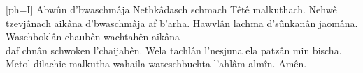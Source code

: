 %
\setcounter{songnum}{500}


[ph={I}]
  \chordsoff %
  \beginverse\justifycenter
    \vspace{3em}
    Abwûn d'bwaschmâja
    \vspace{1em}
    Nethkâdasch schmach
    \vspace{1em}
    Têtê malkuthach.
    \vspace{1em}
    Nehwê tzevjânach aikâna d'bwaschmâja af b'arha.
    \vspace{1em}
    Hawvlân lachma d'sûnkanân jaomâna.
    \vspace{1em}
    Waschboklân chaubên wachtahên aikâna\\
    daf chnân schwoken l'chaijabên.
    \vspace{1em}
    Wela tachlân l'nesjuna
    \vspace{1em}
    ela patzân min bischa.
    \vspace{1em}
    Metol dilachie malkutha wahaila wateschbuchta l'ahlâm almîn.
    \vspace{1em}
    Amên.
    \vspace{5em}
  \endverse
  \brk %
